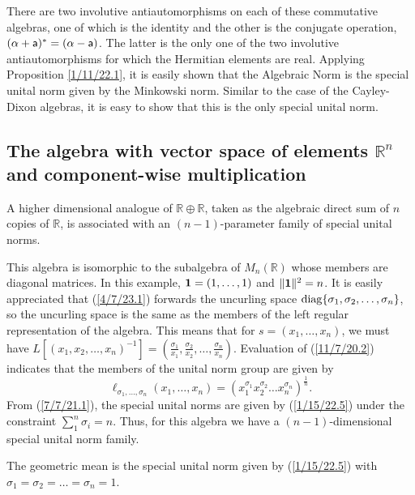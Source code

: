 \documentclass{amsart}
\numberwithin{equation}{section}
\theoremstyle{definition}
\numberwithin{theorem}{section}
\begin{document}
 There are two involutive antiautomorphisms on each of these commutative algebras, one of which is the identity and the other is the conjugate operation, $(\alpha+ {\sf a})^* = (\alpha- {\sf a})$. The latter is the only one of the two involutive antiautomorphisms  for which the Hermitian elements are real.  Applying Proposition \ref{1/11/22.1}, it is easily shown that the Algebraic Norm is the special unital norm given by the Minkowski norm.  Similar to the case of the Cayley-Dixon algebras, it is easy to show that this is the only special unital norm.

 
 \subsection{The algebra with vector space of elements $\mathbb{R}^n$ and component-wise multiplication} A higher dimensional analogue of $\mathbb{R}\oplus \mathbb{R}$, taken as the algebraic direct sum of $n$ copies of $\mathbb{R}$, is associated with an $(n-1)$-parameter family of  special unital norms.

 This algebra is isomorphic to the subalgebra of $ M_n(\mathbb{R})$  whose members are diagonal matrices. In this example, ${\bf 1} = (1,\dots,1)$ and $\|{\bf 1}\|^2 = n$.   It is easily appreciated that (\ref{4/7/23.1}) forwards the uncurling space ${\rm diag} \{ \sigma_1, \sigma_2,\dots,\sigma_n\}$, so the uncurling space is the same as the members of the left regular representation of the algebra.  This means that for $s=(x_1,\dots,x_n)$, we must have $L[(x_1,x_2,\dots,x_n)^{-1}] = (\frac{\sigma_1}{x_1}, \frac{\sigma_2}{x_2},\dots,\frac{\sigma_n}{x_n})$.     Evaluation of (\ref{11/7/20.2}) indicates that the members of the unital norm group are given by  \begin{equation}\label{1/15/22.5} \ell_{\sigma_1,\dots,\sigma_n}(x_1,\dots,x_n) = (x_1^{\sigma_1} x_2^{\sigma_2} \dots x_n^{\sigma_n})^\frac{1}{n}. \end{equation} From (\ref{7/7/21.1}), the special unital norms are given by (\ref{1/15/22.5}) under the constraint $\sum_1^n \sigma_i = n$. Thus, for this algebra we have a $(n-1)$-dimensional special unital norm family.   
 
 The geometric mean is the special unital norm given by (\ref{1/15/22.5}) with $\sigma_1=\sigma_2=\dots =\sigma_n = 1$.  
   
\end{document}
